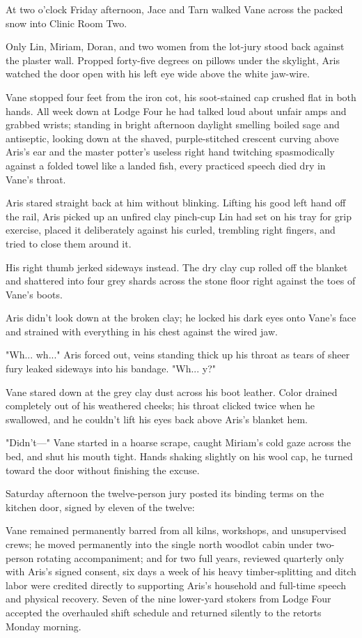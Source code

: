 At two o'clock Friday afternoon, Jace and Tarn walked Vane across the packed snow into Clinic Room Two.

Only Lin, Miriam, Doran, and two women from the lot-jury stood back against the plaster wall. Propped forty-five degrees on pillows under the skylight, Aris watched the door open with his left eye wide above the white jaw-wire.

Vane stopped four feet from the iron cot, his soot-stained cap crushed flat in both hands. All week down at Lodge Four he had talked loud about unfair amps and grabbed wrists; standing in bright afternoon daylight smelling boiled sage and antiseptic, looking down at the shaved, purple-stitched crescent curving above Aris's ear and the master potter's useless right hand twitching spasmodically against a folded towel like a landed fish, every practiced speech died dry in Vane's throat.

Aris stared straight back at him without blinking. Lifting his good left hand off the rail, Aris picked up an unfired clay pinch-cup Lin had set on his tray for grip exercise, placed it deliberately against his curled, trembling right fingers, and tried to close them around it.

His right thumb jerked sideways instead. The dry clay cup rolled off the blanket and shattered into four grey shards across the stone floor right against the toes of Vane's boots.

Aris didn't look down at the broken clay; he locked his dark eyes onto Vane's face and strained with everything in his chest against the wired jaw.

"Wh... wh..." Aris forced out, veins standing thick up his throat as tears of sheer fury leaked sideways into his bandage. "Wh... y?"

Vane stared down at the grey clay dust across his boot leather. Color drained completely out of his weathered cheeks; his throat clicked twice when he swallowed, and he couldn't lift his eyes back above Aris's blanket hem.

"Didn't—" Vane started in a hoarse scrape, caught Miriam's cold gaze across the bed, and shut his mouth tight. Hands shaking slightly on his wool cap, he turned toward the door without finishing the excuse.

\bigskip

Saturday afternoon the twelve-person jury posted its binding terms on the kitchen door, signed by eleven of the twelve:

Vane remained permanently barred from all kilns, workshops, and unsupervised crews; he moved permanently into the single north woodlot cabin under two-person rotating accompaniment; and for two full years, reviewed quarterly only with Aris's signed consent, six days a week of his heavy timber-splitting and ditch labor were credited directly to supporting Aris's household and full-time speech and physical recovery. Seven of the nine lower-yard stokers from Lodge Four accepted the overhauled shift schedule and returned silently to the retorts Monday morning.

